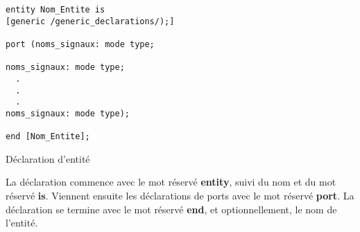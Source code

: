 \documentclass[11pt]{article}
\begin{document}
\begin{listing}[htbp]
\begin{verbatim}
entity Nom_Entite is 
[generic /generic_declarations/);]

port (noms_signaux: mode type;

noms_signaux: mode type;
  .
  .
  .
noms_signaux: mode type);

end [Nom_Entite];
\end{verbatim}
\caption{Déclaration d'entité}
\end{listing}

La déclaration commence avec le mot réservé \textbf{entity}, suivi du nom et
du mot réservé \textbf{is}. Viennent ensuite les déclarations de ports avec le
mot réservé \textbf{port}. La déclaration se termine avec le mot réservé
\textbf{end}, et optionnellement, le nom de l'entité.
\end{document}
